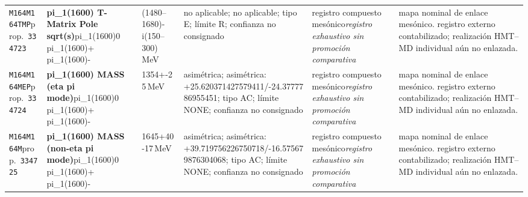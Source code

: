 \begin{landscape}
\begin{longtable}{L{1.85cm}L{4.45cm}L{2.35cm}L{4.05cm}L{3.35cm}L{7.15cm}}
\texttt{M164}\newline \texttt{M164TMP}\newline prop.\ \texttt{334723} & \textbf{pi\_\allowbreak{}1(1600) T-Matrix Pole sqrt(s)}\newline pi\_\allowbreak{}1(1600)0 \textbar{}\allowbreak{} pi\_\allowbreak{}1(1600)+ \textbar{}\allowbreak{} pi\_\allowbreak{}1(1600)- & (1480--1680)-i(150--300)\,MeV & no aplicable; no aplicable; tipo E; límite R; confianza no consignado & registro compuesto mesónico\newline \emph{registro exhaustivo sin promoción comparativa} & mapa nominal de enlace mesónico. registro externo contabilizado; realización HMT--MD individual aún no enlazada. \\
\texttt{M164}\newline \texttt{M164MEP}\newline prop.\ \texttt{334724} & \textbf{pi\_\allowbreak{}1(1600) MASS (eta pi mode)}\newline pi\_\allowbreak{}1(1600)0 \textbar{}\allowbreak{} pi\_\allowbreak{}1(1600)+ \textbar{}\allowbreak{} pi\_\allowbreak{}1(1600)- & 1354+-25\,MeV & asimétrica; asimétrica: +25.620371427579411/-24.3777786955451; tipo AC; límite NONE; confianza no consignado & registro compuesto mesónico\newline \emph{registro exhaustivo sin promoción comparativa} & mapa nominal de enlace mesónico. registro externo contabilizado; realización HMT--MD individual aún no enlazada. \\
\texttt{M164}\newline \texttt{M164M}\newline prop.\ \texttt{334725} & \textbf{pi\_\allowbreak{}1(1600) MASS (non-eta pi mode)}\newline pi\_\allowbreak{}1(1600)0 \textbar{}\allowbreak{} pi\_\allowbreak{}1(1600)+ \textbar{}\allowbreak{} pi\_\allowbreak{}1(1600)- & 1645+40-17\,MeV & asimétrica; asimétrica: +39.719756226750718/-16.575679876304068; tipo AC; límite NONE; confianza no consignado & registro compuesto mesónico\newline \emph{registro exhaustivo sin promoción comparativa} & mapa nominal de enlace mesónico. registro externo contabilizado; realización HMT--MD individual aún no enlazada. \\

\end{longtable}
\end{landscape}
